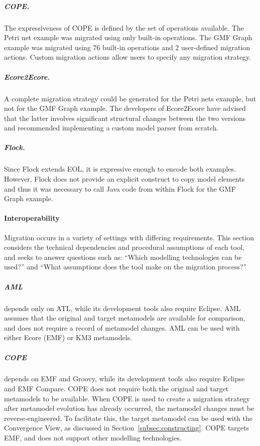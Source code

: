 \subparagraph{COPE.} The expressiveness of COPE is defined by the set of operations available. The Petri net example was migrated using only built-in operations. The GMF Graph example was migrated using 76 built-in operations and 2 user-defined migration actions. Custom migration actions allow users to specify any migration strategy.

 \subparagraph{Ecore2Ecore.} A complete migration strategy could be generated for the Petri nets example, but not for the GMF Graph example. The developers of Ecore2Ecore have advised that the latter involves significant structural changes between the two versions and recommended implementing a custom model parser from scratch.

\subparagraph{Flock.} Since Flock extends EOL, it is expressive enough to encode both examples. However, Flock does not provide an explicit construct to copy model elements and thus it was necessary to call Java code from within Flock for the GMF Graph example.



\paragraph{Interoperability}
Migration occurs in a variety of settings with differing requirements. This section considers the technical dependencies and procedural assumptions of each tool, and seeks to answer questions such as: ``Which modelling technologies can be used?'' and ``What assumptions does the tool make on the migration process?''



\subparagraph{AML} depends only on ATL, while its development tools also require Eclipse. AML assumes that the original and target metamodels are available for comparison, and does not require a record of metamodel changes. AML can be used with either Ecore (EMF) or KM3 metamodels.

\subparagraph{COPE} depends on EMF and Groovy, while its development tools also require Eclipse and EMF Compare. COPE does not require both the original and target metamodels to be available. When COPE is used to create a migration strategy after metamodel evolution has already occurred, the metamodel changes must be reverse-engineered. To facilitate this, the target metamodel can be used with the Convergence View, as discussed in Section~\ref{subsec:constructing}. COPE targets EMF, and does not support other modelling technologies.

